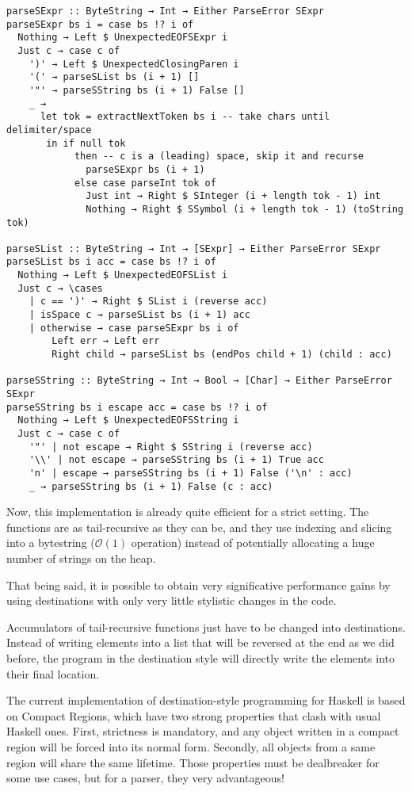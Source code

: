 \documentclass[english]{jflart}
\begin{document}
\begin{verbatim}
parseSExpr :: ByteString → Int → Either ParseError SExpr
parseSExpr bs i = case bs !? i of
  Nothing → Left $ UnexpectedEOFSExpr i
  Just c → case c of
    ')' → Left $ UnexpectedClosingParen i
    '(' → parseSList bs (i + 1) []
    '"' → parseSString bs (i + 1) False []
    _ →
      let tok = extractNextToken bs i -- take chars until delimiter/space
       in if null tok
            then -- c is a (leading) space, skip it and recurse
              parseSExpr bs (i + 1)
            else case parseInt tok of
              Just int → Right $ SInteger (i + length tok - 1) int
              Nothing → Right $ SSymbol (i + length tok - 1) (toString tok)

parseSList :: ByteString → Int → [SExpr] → Either ParseError SExpr
parseSList bs i acc = case bs !? i of
  Nothing → Left $ UnexpectedEOFSList i
  Just c → \cases
    | c == ')' → Right $ SList i (reverse acc)
    | isSpace c → parseSList bs (i + 1) acc
    | otherwise → case parseSExpr bs i of
        Left err → Left err
        Right child → parseSList bs (endPos child + 1) (child : acc)

parseSString :: ByteString → Int → Bool → [Char] → Either ParseError SExpr
parseSString bs i escape acc = case bs !? i of
  Nothing → Left $ UnexpectedEOFSString i
  Just c → case c of
    '"' | not escape → Right $ SString i (reverse acc)
    '\\' | not escape → parseSString bs (i + 1) True acc
    'n' | escape → parseSString bs (i + 1) False ('\n' : acc)
    _ → parseSString bs (i + 1) False (c : acc)
\end{verbatim}

Now, this implementation is already quite efficient for a strict setting. The functions are as tail-recursive as they can be, and they use indexing and slicing into a bytestring ($\mathcal{O}(1)$ operation) instead of potentially allocating a huge number of strings on the heap.

That being said, it is possible to obtain very significative performance gains by using destinations with only very little stylistic changes in the code.

Accumulators of tail-recursive functions just have to be changed into destinations. Instead of writing elements into a list that will be reversed at the end as we did before, the program in the destination style will directly write the elements into their final location.

The current implementation of destination-style programming for Haskell is based on Compact Regions, which have two strong properties that clash with usual Haskell ones. First, strictness is mandatory, and any object written in a compact region will be forced into its normal form. Secondly, all objects from a same region will share the same lifetime. Those properties must be dealbreaker for some use cases, but for a parser, they very advantageous!
\end{document}
